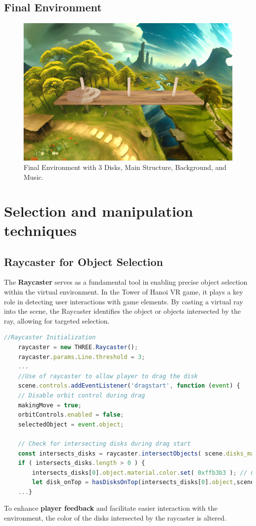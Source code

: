 \documentclass{article}
\begin{document}
\subsection{Final Environment}
\begin{figure}[h]
    \centering
    \includegraphics[width=1\textwidth]{img/result.png}
    \caption{Final Environment with 3 Disks, Main Structure, Background, and Music.}
    \label{fig:final_environment}
\end{figure}
\newpage
\section{Selection and manipulation techniques}
\subsection{Raycaster for Object Selection}
The \textbf{Raycaster} serves as a fundamental tool in enabling precise object selection within the virtual environment. In the Tower of Hanoi VR game, it plays a key role in detecting user interactions with game elements. By casting a virtual ray into the scene, the Raycaster identifies the object or objects intersected by the ray, allowing for targeted selection.
\begin{lstlisting}[language=JavaScript, caption={Use of Raycaster}]
    //Raycaster Initialization
    raycaster = new THREE.Raycaster();
    raycaster.params.Line.threshold = 3;
    ...
    //Use of raycaster to allow player to drag the disk
    scene.controls.addEventListener('dragstart', function (event) {
    // Disable orbit control during drag
    makingMove = true;
    orbitControls.enabled = false;
    selectedObject = event.object;

    // Check for intersecting disks during drag start
    const intersects_disks = raycaster.intersectObjects( scene.disks_mashes, true );
    if ( intersects_disks.length > 0 ) {
        intersects_disks[0].object.material.color.set( 0xffb3b3 ); // Change color of selected object
        let disk_onTop = hasDisksOnTop(intersects_disks[0].object,scene.disks_mashes);
    ...}
\end{lstlisting}
To enhance \textbf{player feedback} and facilitate easier interaction with the environment, the color of the disks intersected by the raycaster is altered.
\end{document}

